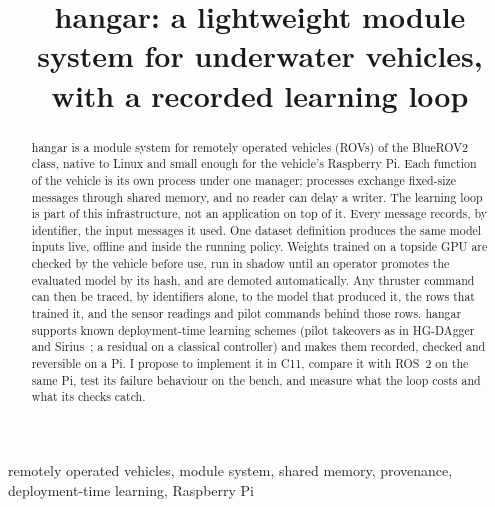 \documentclass[conference]{IEEEtran}
\begin{document}
\title{hangar: a lightweight module system for underwater vehicles, with a
recorded learning loop}

\author{
}


\maketitle


\begin{abstract}
hangar is a module system for remotely operated vehicles (ROVs) of the
BlueROV2 class, native to Linux and small enough for the vehicle's Raspberry
Pi. Each function of the vehicle is its own process under one manager;
processes exchange fixed-size messages through shared memory, and no reader
can delay a writer. The learning loop is part of this infrastructure, not an
application on top of it. Every message records, by identifier, the input
messages it used. One dataset definition produces the same model inputs live,
offline and inside the running policy. Weights trained on a topside GPU are
checked by the vehicle before use, run in shadow until an operator promotes
the evaluated model by its hash, and are demoted automatically. Any thruster
command can then be traced, by identifiers alone, to the model that produced
it, the rows that trained it, and the sensor readings and pilot commands
behind those rows. hangar supports known deployment-time learning schemes
(pilot takeovers as in HG-DAgger~\cite{kelly2019hgdagger} and
Sirius~\cite{liu2023sirius}; a residual on a classical controller) and makes
them recorded, checked and reversible on a Pi. I propose to implement it in
C11, compare it with ROS~2 on the same Pi, test its failure behaviour on the
bench, and measure what the loop costs and what its checks catch.
\end{abstract}

\begin{IEEEkeywords}
remotely operated vehicles, module system, shared memory, provenance,
deployment-time learning, Raspberry Pi
\end{IEEEkeywords}
\end{document}
